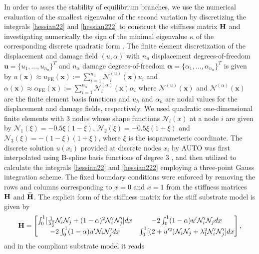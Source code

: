 In order to asses the stability of equilibrium branches, we use  the numerical evaluation of the smallest eigenvalue of the second variation by discretizing the integrals \eqref{hessian22} and   \eqref{hessian222} to construct the stiffness matrix
$\mathbf{H}$ and investigating numerically the sign of the minimal eigenvalue $\kappa$ of the corresponding discrete quadratic form \cite{Sanderson2016-ht}.  The finite element discretization of the displacement and damage field $(u, \alpha )$     with \( n_u \) displacement degrees-of-freedom 
$
\mathbf{u} = \{ u_1, \ldots, u_{n_u} \}^T 
$
and \( n_\alpha \) damage degrees-of-freedom 
$
\boldsymbol{\alpha} = \{ \alpha_1, \ldots, \alpha_{n_\alpha} \}^T
$ is given by 
$
u(\mathbf{x}) \approx u_{\text{FE}} (\mathbf{x}) := \sum_{i=1}^{n_u} \mathcal{N}^{(u)}_i(\mathbf{x}) u_i $
and $\alpha(\mathbf{x}) \approx \alpha_{\text{FE}} (\mathbf{x}) := \sum_{i=1}^{n_\alpha} \mathcal{N}^{(\alpha)}_i (\mathbf{x}) \alpha_i 
$
where $\mathcal{N}^{(u)}(\mathbf{x}) $ and $\mathcal{N}^{(\alpha)}(\mathbf{x}) $ are the finite element basis functions and  $u_h$ and  $\alpha_h$ are nodal values for the displacement and damage fields, respectively. We used quadratic one-dimensional finite elements with 3 nodes  whose   shape functions   ${\mathcal N}_i(x)$ at a node $i$  are given by ${\mathcal N}_1(\xi)=-0.5\xi(1-\xi)$, ${\mathcal N}_2(\xi)=-0.5\xi(1+\xi)$ and ${\mathcal N}_3(\xi)=-(1-\xi)(1+\xi)$, where $\xi$ is the isoparameteric coordinate. The discrete solution $u(x_i)$ provided at discrete nodes $x_i$ by AUTO was first interpolated using B-spline basis functions of degree 3 \cite{Grimstad2016-cq}, and then utilized to calculate the integrals \eqref{hessian22} and   \ref{hessian222} employing a three-point Gauss integration scheme. The fixed boundary conditions were enforced by removing the rows and columns corresponding to $x = 0$ and $x = 1$ from the stiffness matrices 
$\mathbf{H}$ and $\widetilde{\mathbf{H}}$. The explicit form of the stiffness matrix for the stiff substrate model is given by
\begin{equation}
    \mathbf{H} = 
    \begin{bmatrix}
\int_0^1[ \frac{1}{\lambda_2^2}{\mathcal N}_i{\mathcal N}_j + (1-\alpha)^2{\mathcal N}'_i{\mathcal N}'_j
] dx&
-2\int_0^1(1-\alpha)u' {\mathcal N}'_i {\mathcal N}_j  dx\\
-2\int_0^1(1-\alpha)u' {\mathcal N}_i {\mathcal N}'_j dx
& \int_0^1 [ (2+u'^2){\mathcal N}_i{\mathcal N}_j +\lambda_1^2{\mathcal N}'_i{\mathcal N}'_j] dx
\end{bmatrix},
\label{eq:stifness1}
\end{equation}
and in the compliant substrate model it reads

